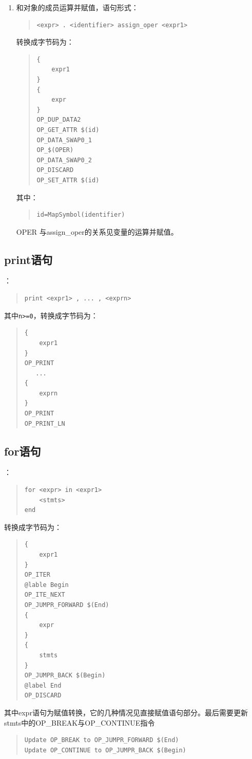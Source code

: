 \begin{enumerate}
\item 和对象的成员运算并赋值，语句形式：
\begin{quote}
\begin{verbatim}
<expr> . <identifier> assign_oper <expr1>
\end{verbatim}
\end{quote}
转换成字节码为：
\begin{quote}
\begin{verbatim}
{
    expr1
}
{
    expr 
}
OP_DUP_DATA2
OP_GET_ATTR $(id)
OP_DATA_SWAP0_1
OP_$(OPER)
OP_DATA_SWAP0_2
OP_DISCARD
OP_SET_ATTR $(id)
\end{verbatim}
\end{quote}
其中：
\begin{quote}
\begin{verbatim}
id=MapSymbol(identifier)
\end{verbatim}
\end{quote}
OPER 与assign\_oper的关系见变量的运算并赋值。
\end{enumerate}

\subsection{print语句}
：
\begin{quote}
\begin{verbatim}
print <expr1> , ... , <exprn>
\end{verbatim}
\end{quote}
其中\verb|n>=0|，转换成字节码为：
\begin{quote}
\begin{verbatim}
{
    expr1
}
OP_PRINT
   ...
{
    exprn
}
OP_PRINT
OP_PRINT_LN
\end{verbatim}
\end{quote}

\subsection{for语句}
：
\begin{quote}
\begin{verbatim}
for <expr> in <expr1>
    <stmts>
end
\end{verbatim}
\end{quote}
转换成字节码为：
\begin{quote}
\begin{verbatim}
{
    expr1
}
OP_ITER
@lable Begin
OP_ITE_NEXT
OP_JUMPR_FORWARD $(End)
{
    expr
}
{
    stmts
}
OP_JUMPR_BACK $(Begin)
@label End
OP_DISCARD 
\end{verbatim}
\end{quote}
其中expr语句为赋值转换，它的几种情况见直接赋值语句部分。最后需要更新stmts中的OP\_BREAK与OP\_CONTINUE指令
\begin{quote}
\begin{verbatim}
Update OP_BREAK to OP_JUMPR_FORWARD $(End)
Update OP_CONTINUE to OP_JUMPR_BACK $(Begin)
\end{verbatim}
\end{quote}



